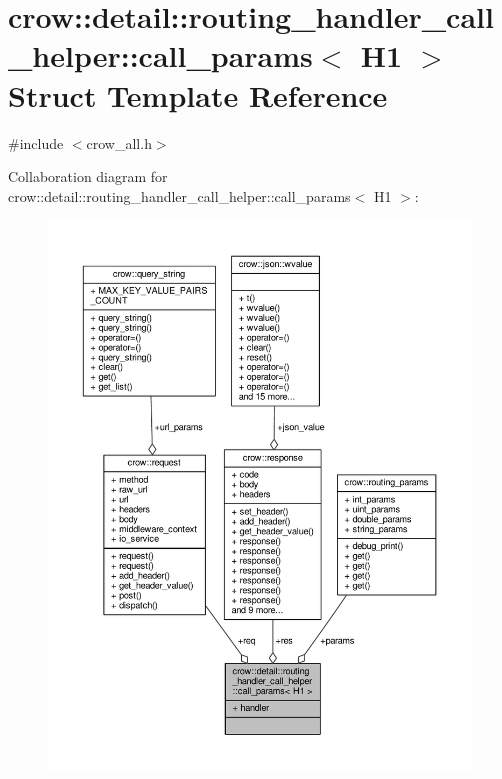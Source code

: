 \hypertarget{structcrow_1_1detail_1_1routing__handler__call__helper_1_1call__params}{\section{crow\-:\-:detail\-:\-:routing\-\_\-handler\-\_\-call\-\_\-helper\-:\-:call\-\_\-params$<$ H1 $>$ Struct Template Reference}
\label{structcrow_1_1detail_1_1routing__handler__call__helper_1_1call__params}
}


{\ttfamily \#include $<$crow\-\_\-all.\-h$>$}



Collaboration diagram for crow\-:\-:detail\-:\-:routing\-\_\-handler\-\_\-call\-\_\-helper\-:\-:call\-\_\-params$<$ H1 $>$\-:
\nopagebreak
\begin{figure}[H]
\begin{center}
\leavevmode
\includegraphics[width=350pt]{structcrow_1_1detail_1_1routing__handler__call__helper_1_1call__params__coll__graph}
\end{center}
\end{figure}
